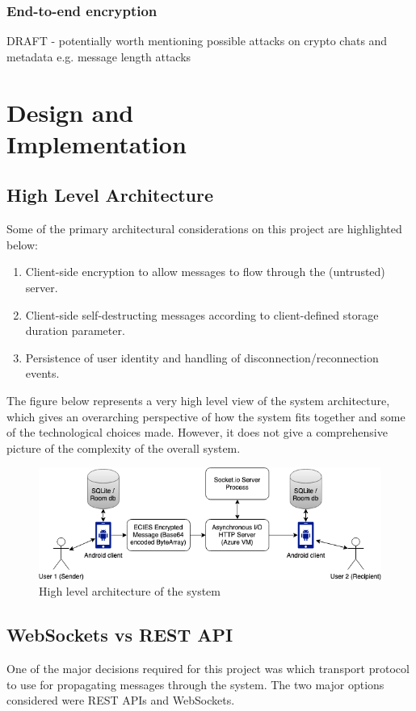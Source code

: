 \documentclass{mproj}
\begin{document}
\subsection{End-to-end encryption}

DRAFT - potentially worth mentioning possible attacks on crypto chats and metadata e.g. message length attacks \cite{degabriele2021hiding}

\chapter{Design and \\ Implementation}\label{design}
\section{High Level Architecture}
Some of the primary architectural considerations on this project are highlighted below:
\begin{enumerate}
	\item Client-side encryption to allow messages to flow through the (untrusted) server.
	\item Client-side self-destructing messages according to client-defined storage duration parameter.
	\item Persistence of user identity and handling of disconnection/reconnection events.
\end{enumerate}

The figure below represents a very high level view of the system architecture, which gives an overarching perspective of how the system fits together and some of the technological choices made. However, it does not give a comprehensive picture of the complexity of the overall system.

\begin{figure}[h!]
\includegraphics[scale=0.5]{images/high-level-architecture.png}
\caption{High level architecture of the system}
\end{figure}

\section{WebSockets vs REST API}
One of the major decisions required for this project was which transport protocol to use for propagating messages through the system. The two major options considered were REST APIs\cite{masse2011rest} and WebSockets\cite{fette2011websocket}. 
\end{document}
